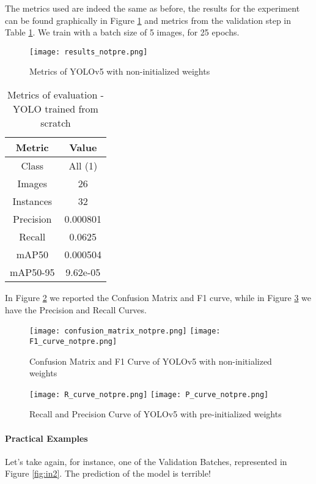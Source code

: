The metrics used are indeed the same as before, the results for the experiment can be found graphically in Figure \ref{fig:resultsyolonot} and metrics from the validation step in Table \ref{tab:table3}. We train with a batch size of 5 images, for 25 epochs.

\begin{figure}[h!]
  \centering
  \texttt{[image: results\_notpre.png]}
  \caption{Metrics of YOLOv5 with non-initialized weights}
  \label{fig:resultsyolonot}
\end{figure}

\begin{table}[h!]
    \centering
    \begin{tabular}{c|c}
    Metric & Value \\
    \hline
    Class & All (1)\\
    Images & 26 \\
    Instances & 32\\
    Precision & 0.000801 \\  
    Recall & 0.0625 \\
    mAP50 & 0.000504\\
    mAP50-95 & 9.62e-05\\
    \end{tabular}
    \caption{Metrics of evaluation - YOLO trained from scratch}
    \label{tab:table3}
\end{table}	

In Figure \ref{fig:Cmatrix_not} we reported the Confusion Matrix and F1 curve, while in Figure \ref{fig:RPCurve_not} we have the Precision and Recall Curves.

\begin{figure}[h!]
  \centering
  \texttt{[image: confusion\_matrix\_notpre.png]}
  \texttt{[image: F1\_curve\_notpre.png]}
  \caption{Confusion Matrix and F1 Curve of YOLOv5 with non-initialized weights}
  \label{fig:Cmatrix_not}
\end{figure}

\begin{figure}[h!]
  \centering
  \texttt{[image: R\_curve\_notpre.png]}
  \texttt{[image: P\_curve\_notpre.png]}
  \caption{Recall and Precision Curve of YOLOv5 with pre-initialized weights}
  \label{fig:RPCurve_not}
\end{figure}


\paragraph{Practical Examples}
Let's take again, for instance, one of the Validation Batches, represented in Figure \ref{fig:in2}. The prediction of the model is terrible!

